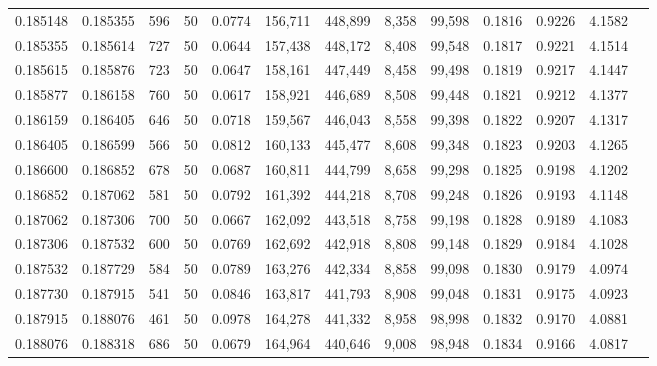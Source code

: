 \begin{tabular}{rrrrrrrrrrrrr}
0.185148 & 0.185355 &   596 &  50 &                                     0.0774 & 156,711 & 448,899 &   8,358 &  99,598 & 0.1816 & 0.9226 & 4.1582 \\
0.185355 & 0.185614 &   727 &  50 &                                     0.0644 & 157,438 & 448,172 &   8,408 &  99,548 & 0.1817 & 0.9221 & 4.1514 \\
0.185615 & 0.185876 &   723 &  50 &                                     0.0647 & 158,161 & 447,449 &   8,458 &  99,498 & 0.1819 & 0.9217 & 4.1447 \\
0.185877 & 0.186158 &   760 &  50 &                                     0.0617 & 158,921 & 446,689 &   8,508 &  99,448 & 0.1821 & 0.9212 & 4.1377 \\
0.186159 & 0.186405 &   646 &  50 &                                     0.0718 & 159,567 & 446,043 &   8,558 &  99,398 & 0.1822 & 0.9207 & 4.1317 \\
0.186405 & 0.186599 &   566 &  50 &                                     0.0812 & 160,133 & 445,477 &   8,608 &  99,348 & 0.1823 & 0.9203 & 4.1265 \\
0.186600 & 0.186852 &   678 &  50 &                                     0.0687 & 160,811 & 444,799 &   8,658 &  99,298 & 0.1825 & 0.9198 & 4.1202 \\
0.186852 & 0.187062 &   581 &  50 &                                     0.0792 & 161,392 & 444,218 &   8,708 &  99,248 & 0.1826 & 0.9193 & 4.1148 \\
0.187062 & 0.187306 &   700 &  50 &                                     0.0667 & 162,092 & 443,518 &   8,758 &  99,198 & 0.1828 & 0.9189 & 4.1083 \\
0.187306 & 0.187532 &   600 &  50 &                                     0.0769 & 162,692 & 442,918 &   8,808 &  99,148 & 0.1829 & 0.9184 & 4.1028 \\
0.187532 & 0.187729 &   584 &  50 &                                     0.0789 & 163,276 & 442,334 &   8,858 &  99,098 & 0.1830 & 0.9179 & 4.0974 \\
0.187730 & 0.187915 &   541 &  50 &                                     0.0846 & 163,817 & 441,793 &   8,908 &  99,048 & 0.1831 & 0.9175 & 4.0923 \\
0.187915 & 0.188076 &   461 &  50 &                                     0.0978 & 164,278 & 441,332 &   8,958 &  98,998 & 0.1832 & 0.9170 & 4.0881 \\
0.188076 & 0.188318 &   686 &  50 &                                     0.0679 & 164,964 & 440,646 &   9,008 &  98,948 & 0.1834 & 0.9166 & 4.0817 \\

\end{tabular}
